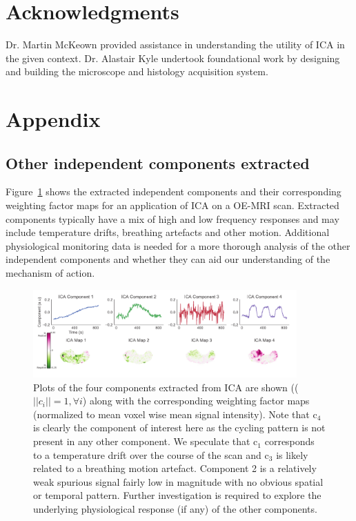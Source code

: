 \section{Acknowledgments}

Dr. Martin McKeown provided assistance in understanding the utility of ICA in the given context. Dr. Alastair Kyle undertook foundational work by designing and building the microscope and histology acquisition system. 

\section{Appendix}

\subsection{Other independent components extracted}

Figure~\ref{Sfig_components} shows the extracted independent components and their corresponding weighting factor maps for an application of ICA on a OE-MRI scan.
Extracted components typically have a mix of high and low frequency responses and may include temperature drifts, breathing artefacts and other motion. 
Additional physiological monitoring data is needed for a more thorough analysis of the other independent components and whether they can aid our understanding of the mechanism of action.

\begin{figure}[htbp]
   \centering
   \includegraphics[width=0.9\textwidth]{oemri_thesis1/oemri_thesis1-images/fig_components.pdf} %
   \caption{Plots of the four components extracted from ICA are shown (($||c_i||=1, \forall i $) along with the corresponding  weighting factor maps (normalized to mean voxel wise mean signal intensity). Note that c$_4$ is clearly the component of interest here as the cycling pattern is not present in any other component. We speculate that c$_1$ corresponds to a temperature drift over the course of the scan and c$_3$ is likely related to a breathing motion artefact. Component 2 is a relatively weak spurious signal fairly low in magnitude with no obvious spatial or temporal pattern. Further investigation is required to explore the underlying physiological response (if any) of the other components.
   \label{Sfig_components}}
\end{figure}

